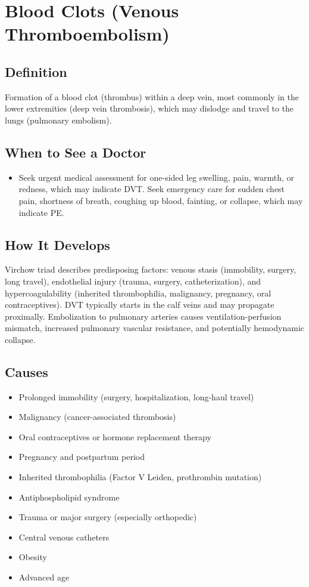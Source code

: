 \chapter{Blood Clots (Venous Thromboembolism)}

\section*{Definition}
Formation of a blood clot (thrombus) within a deep vein, most commonly in the lower extremities (deep vein thrombosis), which may dislodge and travel to the lungs (pulmonary embolism).

\section*{When to See a Doctor}

\begin{itemize}
 \item Seek urgent medical assessment for one-sided leg swelling, pain, warmth, or redness, which may indicate DVT. Seek emergency care for sudden chest pain, shortness of breath, coughing up blood, fainting, or collapse, which may indicate PE.
\end{itemize}

\section*{How It Develops}
Virchow triad describes predisposing factors: venous stasis (immobility, surgery, long travel), endothelial injury (trauma, surgery, catheterization), and hypercoagulability (inherited thrombophilia, malignancy, pregnancy, oral contraceptives). DVT typically starts in the calf veins and may propagate proximally. Embolization to pulmonary arteries causes ventilation-perfusion mismatch, increased pulmonary vascular resistance, and potentially hemodynamic collapse.

\section*{Causes}
\begin{itemize}
 \item Prolonged immobility (surgery, hospitalization, long-haul travel)
 \item Malignancy (cancer-associated thrombosis)
 \item Oral contraceptives or hormone replacement therapy
 \item Pregnancy and postpartum period
 \item Inherited thrombophilia (Factor V Leiden, prothrombin mutation)
 \item Antiphospholipid syndrome
 \item Trauma or major surgery (especially orthopedic)
 \item Central venous catheters
 \item Obesity
 \item Advanced age
\end{itemize}

